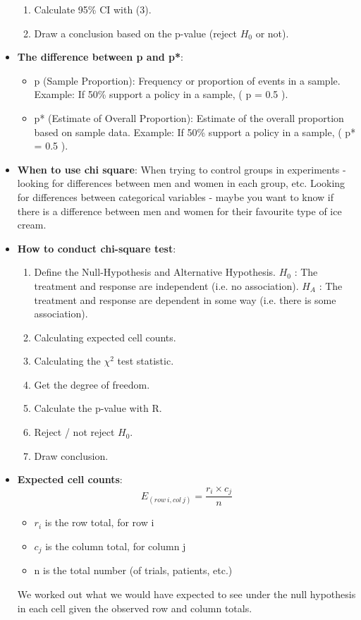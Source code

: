 \documentclass[12pt]{book}
\begin{document}
\begin{itemize}
\begin{enumerate}
\item Calculate 95\% CI with (3).
\item Draw a conclusion based on the p-value (reject $H_0$ or not).
\end{enumerate}
\item \textbf{The difference between p and p*}:
\begin{itemize}
\item p (Sample Proportion): Frequency or proportion of events in a sample. Example: If 50\% support a policy in a sample, ( p = 0.5 ).
\item p* (Estimate of Overall Proportion): Estimate of the overall proportion based on sample data. Example: If 50\% support a policy in a sample, ( p* = 0.5 ).
\end{itemize}
\item \textbf{When to use chi square}: When trying to control groups in experiments - looking for differences between men and women in each group, etc. Looking for differences between categorical variables - maybe you want to know if there is a difference between men and women for their favourite type of ice cream.
\item \textbf{How to conduct chi-square test}:
\begin{enumerate}
\item Define the Null-Hypothesis and Alternative Hypothesis. $H_0$ : The treatment and response are independent (i.e. no association). $H_A$ : The treatment and response are dependent in some way (i.e. there is some association).
\item Calculating expected cell counts.
\item Calculating the $\chi^2$ test statistic.
\item Get the degree of freedom.
\item Calculate the p-value with R.
\item Reject / not reject $H_0$.
\item Draw conclusion.
\end{enumerate}
\item \textbf{Expected cell counts}: 
$$E_{(row \ i, col \ j)} = \frac{r_i \times c_j}{n}$$
\begin{itemize}
\item $r_i$ is the row total, for row i
\item $c_j$ is the column total, for column j 
\item n is the total number (of trials, patients, etc.)
\end{itemize}
We worked out what we would have expected to see under the null hypothesis in each cell given the observed row and column totals.

\end{itemize}
\end{document}

